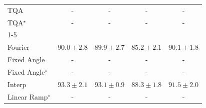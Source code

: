 \begin{tabular}{l|cccc|}
TQA & {\cellcolor[HTML]{000000}} \color[HTML]{F1F1F1} {\cellcolor{white}} \color{black} - & {\cellcolor[HTML]{000000}} \color[HTML]{F1F1F1} {\cellcolor{white}} \color{black} - & {\cellcolor[HTML]{000000}} \color[HTML]{F1F1F1} {\cellcolor{white}} \color{black} - & {\cellcolor[HTML]{000000}} \color[HTML]{F1F1F1} {\cellcolor{white}} \color{black} - \\
TQA$^\star$ & {\cellcolor[HTML]{000000}} \color[HTML]{F1F1F1} {\cellcolor{white}} \color{black} - & {\cellcolor[HTML]{000000}} \color[HTML]{F1F1F1} {\cellcolor{white}} \color{black} - & {\cellcolor[HTML]{000000}} \color[HTML]{F1F1F1} {\cellcolor{white}} \color{black} - & {\cellcolor[HTML]{000000}} \color[HTML]{F1F1F1} {\cellcolor{white}} \color{black} - \\
\cline{1-5}
\multicolumn{5}{c}{\rule{0pt}{8pt}PP} \\
\midrule
Fourier & {\cellcolor[HTML]{42AB5D}} \color[HTML]{F1F1F1} $90.0\pm 2.8$ & {\cellcolor[HTML]{43AC5E}} \color[HTML]{F1F1F1} $89.9\pm 2.7$ & {\cellcolor[HTML]{ABDC8D}} \color[HTML]{000000} $85.2\pm 2.1$ & {\cellcolor[HTML]{40AA5C}} \color[HTML]{F1F1F1} $90.1\pm 1.8$ \\
Fixed Angle & {\cellcolor[HTML]{000000}} \color[HTML]{F1F1F1} {\cellcolor{white}} \color{black} - & {\cellcolor[HTML]{000000}} \color[HTML]{F1F1F1} {\cellcolor{white}} \color{black} - & {\cellcolor[HTML]{000000}} \color[HTML]{F1F1F1} {\cellcolor{white}} \color{black} - & {\cellcolor[HTML]{000000}} \color[HTML]{F1F1F1} {\cellcolor{white}} \color{black} - \\
Fixed Angle$^\star$ & {\cellcolor[HTML]{000000}} \color[HTML]{F1F1F1} {\cellcolor{white}} \color{black} - & {\cellcolor[HTML]{000000}} \color[HTML]{F1F1F1} {\cellcolor{white}} \color{black} - & {\cellcolor[HTML]{000000}} \color[HTML]{F1F1F1} {\cellcolor{white}} \color{black} - & {\cellcolor[HTML]{000000}} \color[HTML]{F1F1F1} {\cellcolor{white}} \color{black} - \\
Interp & {\cellcolor[HTML]{187B3F}} \color[HTML]{F1F1F1} $93.3\pm 2.1$ & {\cellcolor[HTML]{1A7D40}} \color[HTML]{F1F1F1} $93.1\pm 0.9$ & {\cellcolor[HTML]{68BE71}} \color[HTML]{000000} $88.3\pm 1.8$ & {\cellcolor[HTML]{2F944E}} \color[HTML]{F1F1F1} $91.5\pm 2.0$ \\
Linear Ramp$^\star$ & {\cellcolor[HTML]{000000}} \color[HTML]{F1F1F1} {\cellcolor{white}} \color{black} - & {\cellcolor[HTML]{000000}} \color[HTML]{F1F1F1} {\cellcolor{white}} \color{black} - & {\cellcolor[HTML]{000000}} \color[HTML]{F1F1F1} {\cellcolor{white}} \color{black} - & {\cellcolor[HTML]{000000}} \color[HTML]{F1F1F1} {\cellcolor{white}} \color{black} - \\

\end{tabular}
